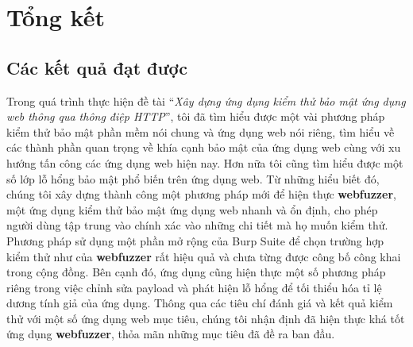 \chapter{Tổng kết}
\section{Các kết quả đạt được}
Trong quá trình thực hiện đề tài ``\textit{Xây dựng ứng dụng kiểm thử bảo mật ứng dụng web thông qua thông điệp HTTP}'', tôi đã tìm hiểu được một vài phương pháp kiểm thử bảo mật phần mềm nói chung và ứng dụng web nói riêng, tìm hiểu về các thành phần quan trọng về khía cạnh bảo mật của ứng dụng web cùng với xu hướng tấn công các ứng dụng web hiện nay. Hơn nữa tôi cũng tìm hiểu được một số lớp lỗ hổng bảo mật phổ biến trên ứng dụng web. Từ những hiểu biết đó, chúng tôi xây dựng thành công một phương pháp mới để hiện thực \textbf{webfuzzer}, một ứng dụng kiểm thử bảo mật ứng dụng web nhanh và ổn định, cho phép người dùng tập trung vào chính xác vào những chi tiết mà họ muốn kiểm thử. Phương pháp sử dụng một phần mở rộng của Burp Suite để chọn trường hợp kiểm thử như của \textbf{webfuzzer} rất hiệu quả và chưa từng được công bố công khai trong cộng đồng. Bên cạnh đó, ứng dụng cũng hiện thực một số phương pháp riêng trong việc chỉnh sửa payload và phát hiện lỗ hổng để tối thiểu hóa tỉ lệ dương tính giả của ứng dụng. Thông qua các tiêu chí đánh giá và kết quả kiểm thử với một số ứng dụng web mục tiêu, chúng tôi nhận định đã hiện thực khá tốt ứng dụng \textbf{webfuzzer}, thỏa mãn những mục tiêu đã đề ra ban đầu.

